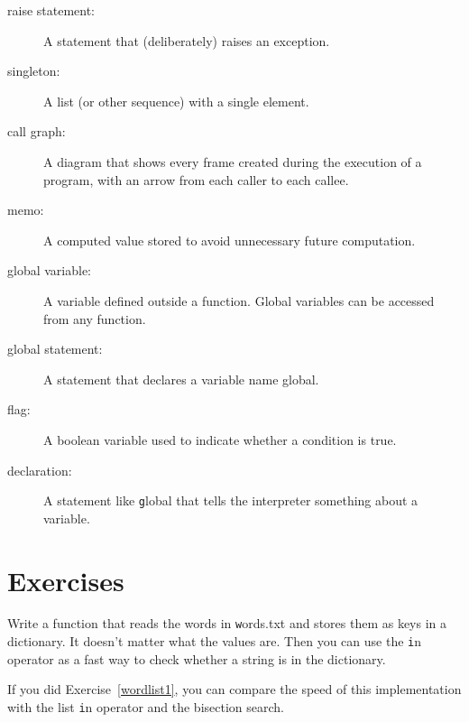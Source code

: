 \documentclass[
DIV=11,
fontsize=13,
twoside,
headinclude=false,
titlepage=firstiscover,
abstract=true,
headsepline=true,
footsepline=true,
chapterprefix=true, %
headings=big,
bibliography=totoc,%
captions=tableheading
]{scrbook}
\theoremstyle{definition}
\begin{document}
\begin{description}
\item[raise statement:]  A statement that (deliberately) raises an exception.

\item[singleton:] A list (or other sequence) with a single element.

\item[call graph:] A diagram that shows every frame created during
the execution of a program, with an arrow from each caller to
each callee. 

\item[memo:] A computed value stored to avoid unnecessary future 
computation.

\item[global variable:]  A variable defined outside a function.  Global
variables can be accessed from any function.

\item[global statement:]  A statement that declares a variable name
global.

\item[flag:] A boolean variable used to indicate whether a condition
is true.

\item[declaration:] A statement like {\texttt global} that tells the
interpreter something about a variable.

\end{description}


\section{Exercises}

\begin{exercise}
\normalfont
\label{wordlist2}

Write a function that reads the words in {\texttt words.txt} and
stores them as keys in a dictionary.  It doesn't matter what the
values are.  Then you can use the {\texttt in} operator
as a fast way to check whether a string is in
the dictionary.

If you did Exercise~\ref{wordlist1}, you can compare the speed
of this implementation with the list {\texttt in} operator and the
bisection search.

\end{exercise}
\end{document}

